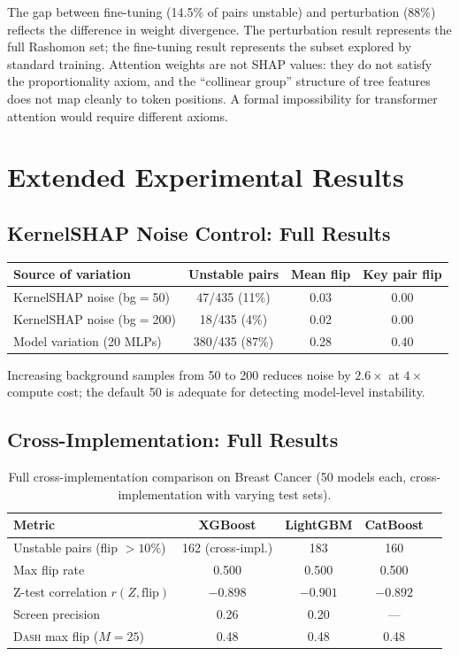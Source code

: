 \documentclass{article}
\newcommand{\DASH}{\textsc{Dash}}
\begin{document}
The gap between fine-tuning (14.5\% of pairs unstable) and perturbation (88\%) reflects the difference in weight divergence. The perturbation result represents the full Rashomon set; the fine-tuning result represents the subset explored by standard training. Attention weights are not SHAP values: they do not satisfy the proportionality axiom, and the ``collinear group'' structure of tree features does not map cleanly to token positions. A formal impossibility for transformer attention would require different axioms.

\section{Extended Experimental Results}
\label{sec:extended-experiments}

\subsection{KernelSHAP Noise Control: Full Results}

\begin{center}
\small
\begin{tabular}{@{}lccc@{}}
\toprule
Source of variation & Unstable pairs & Mean flip & Key pair flip \\
\midrule
KernelSHAP noise (bg$=$50) & 47/435 (11\%) & 0.03 & 0.00 \\
KernelSHAP noise (bg$=$200) & 18/435 (4\%) & 0.02 & 0.00 \\
Model variation (20 MLPs) & 380/435 (87\%) & 0.28 & 0.40 \\
\bottomrule
\end{tabular}
\end{center}

Increasing background samples from 50 to 200 reduces noise by $2.6\times$ at $4\times$ compute cost; the default 50 is adequate for detecting model-level instability.

\subsection{Cross-Implementation: Full Results}

\begin{table}[t]
\centering
\caption{Full cross-implementation comparison on Breast Cancer (50 models each, cross-implementation with varying test sets).}
\small
\begin{tabular}{@{}lcccc@{}}
\toprule
Metric & XGBoost & LightGBM & CatBoost \\
\midrule
Unstable pairs (flip $> 10\%$) & 162 (cross-impl.) & 183 & 160 \\
Max flip rate & 0.500 & 0.500 & 0.500 \\
Z-test correlation $r(Z, \text{flip})$ & $-0.898$ & $-0.901$ & $-0.892$ \\
Screen precision & 0.26 & 0.20 & --- \\
\DASH{} max flip ($M{=}25$) & 0.48 & 0.48 & 0.48 \\
\bottomrule
\end{tabular}
\end{table}
\end{document}
